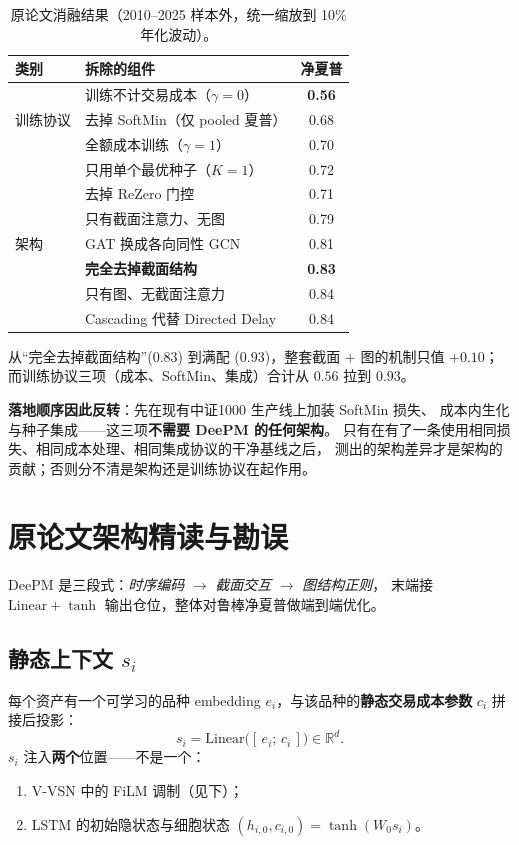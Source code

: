 \documentclass[11pt, a4paper]{ctexart}
\begin{document}
\begin{table}[h]
\centering
\small
\begin{tabular}{llc}
\toprule
类别 & 拆除的组件 & 净夏普 \\
\midrule
\multirow{3}{*}{训练协议}
 & 训练不计交易成本（$\gamma=0$） & \textbf{0.56} \\
 & 去掉 SoftMin（仅 pooled 夏普） & 0.68 \\
 & 全额成本训练（$\gamma=1$） & 0.70 \\
 & 只用单个最优种子（$K=1$） & 0.72 \\
\midrule
\multirow{5}{*}{架构}
 & 去掉 ReZero 门控 & 0.71 \\
 & 只有截面注意力、无图 & 0.79 \\
 & GAT 换成各向同性 GCN & 0.81 \\
 & \textbf{完全去掉截面结构} & \textbf{0.83} \\
 & 只有图、无截面注意力 & 0.84 \\
 & Cascading 代替 Directed Delay & 0.84 \\
\bottomrule
\end{tabular}
\caption{原论文消融结果（2010--2025 样本外，统一缩放到 10\% 年化波动）。}
\end{table}

从“完全去掉截面结构”($0.83$) 到满配 ($0.93$)，整套截面 $+$ 图的机制只值
$+0.10$；而训练协议三项（成本、SoftMin、集成）合计从 $0.56$ 拉到 $0.93$。

\begin{warnbox}
\textbf{落地顺序因此反转}：先在现有中证1000 生产线上加装 SoftMin 损失、
成本内生化与种子集成——这三项\textbf{不需要 DeePM 的任何架构}。
只有在有了一条使用相同损失、相同成本处理、相同集成协议的干净基线之后，
测出的架构差异才是架构的贡献；否则分不清是架构还是训练协议在起作用。
\end{warnbox}

\section{原论文架构精读与勘误}

DeePM 是三段式：\emph{时序编码} $\to$ \emph{截面交互} $\to$ \emph{图结构正则}，
末端接 $\text{Linear}+\tanh$ 输出仓位，整体对鲁棒净夏普做端到端优化。

\subsection{静态上下文 $s_i$}
每个资产有一个可学习的品种 embedding $e_i$，与该品种的\textbf{静态交易成本参数} $c_i$
拼接后投影：
\begin{equation}
s_i = \mathrm{Linear}\bigl([\,e_i;\,c_i\,]\bigr) \in \mathbb{R}^d .
\end{equation}
$s_i$ 注入\textbf{两个}位置——不是一个：
\begin{enumerate}
  \item V-VSN 中的 FiLM 调制（见下）；
  \item LSTM 的初始隐状态与细胞状态 $(h_{i,0}, c_{i,0}) = \tanh(W_0 s_i)$。
\end{enumerate}
\end{document}
